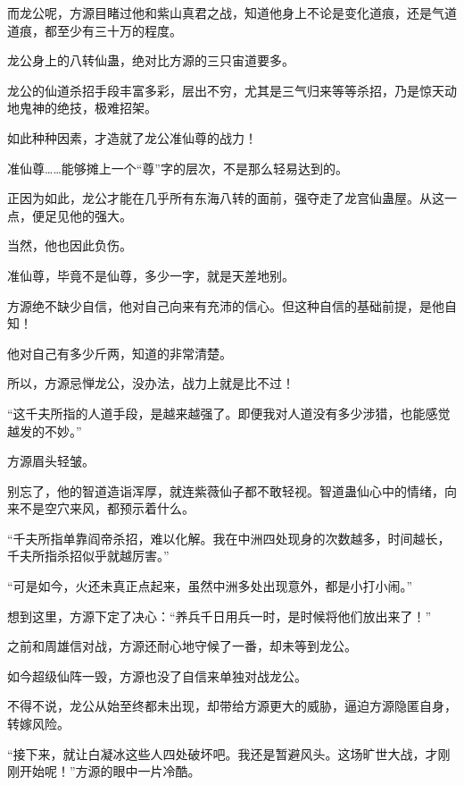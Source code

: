 \begin{this_body}
而龙公呢，方源目睹过他和紫山真君之战，知道他身上不论是变化道痕，还是气道道痕，都至少有三十万的程度。

龙公身上的八转仙蛊，绝对比方源的三只宙道要多。

龙公的仙道杀招手段丰富多彩，层出不穷，尤其是三气归来等等杀招，乃是惊天动地鬼神的绝技，极难招架。

如此种种因素，才造就了龙公准仙尊的战力！

准仙尊……能够摊上一个“尊”字的层次，不是那么轻易达到的。

正因为如此，龙公才能在几乎所有东海八转的面前，强夺走了龙宫仙蛊屋。从这一点，便足见他的强大。

当然，他也因此负伤。

准仙尊，毕竟不是仙尊，多少一字，就是天差地别。

方源绝不缺少自信，他对自己向来有充沛的信心。但这种自信的基础前提，是他自知！

他对自己有多少斤两，知道的非常清楚。

所以，方源忌惮龙公，没办法，战力上就是比不过！

“这千夫所指的人道手段，是越来越强了。即便我对人道没有多少涉猎，也能感觉越发的不妙。”

方源眉头轻皱。

别忘了，他的智道造诣浑厚，就连紫薇仙子都不敢轻视。智道蛊仙心中的情绪，向来不是空穴来风，都预示着什么。

“千夫所指单靠阎帝杀招，难以化解。我在中洲四处现身的次数越多，时间越长，千夫所指杀招似乎就越厉害。”

“可是如今，火还未真正点起来，虽然中洲多处出现意外，都是小打小闹。”

想到这里，方源下定了决心：“养兵千日用兵一时，是时候将他们放出来了！”

之前和周雄信对战，方源还耐心地守候了一番，却未等到龙公。

如今超级仙阵一毁，方源也没了自信来单独对战龙公。

不得不说，龙公从始至终都未出现，却带给方源更大的威胁，逼迫方源隐匿自身，转嫁风险。

“接下来，就让白凝冰这些人四处破坏吧。我还是暂避风头。这场旷世大战，才刚刚开始呢！”方源的眼中一片冷酷。

\end{this_body}

